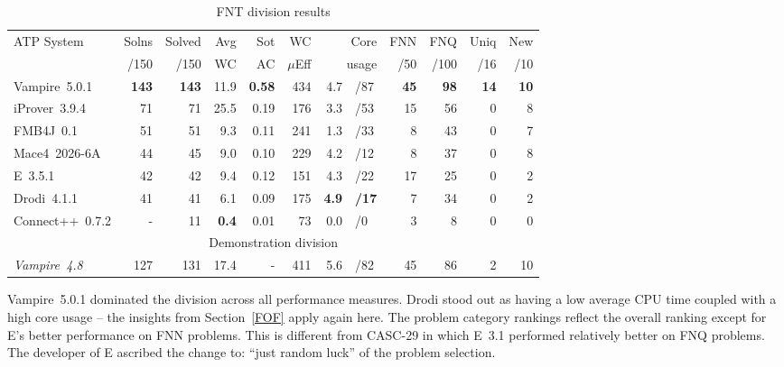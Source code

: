 \documentclass[aic]{iosart2x}
\newcommand{\bb}[1]{\bf {#1}}
\begin{document}
\begin{table}[tbh]
\caption{FNT division results}
\label{FNTSummary}
\begin{tabular}{lrrrrrr@{}l@{}rrrr}
\hline
ATP System             & Solns & Solved & Avg  &  Sot & WC       & \multicolumn{2}{r}{Core} & FNN & FNQ &Uniq & New  \\
                       & /150  & /150   & WC   &  AC  & $\mu$Eff & \multicolumn{2}{r}{usage}& /50 &/100 & /16 & /10  \\
\hline
Vampire~5.0.1          &  \bb{143}  &  \bb{143}   & 11.9 & \bb{0.58} & 434      & 4.7       & {\tiny /87 } &  \bb{45} &  \bb{98} &  \bb{14} &  \bb{10}  \\
iProver~3.9.4          &   71  &   71   & 25.5 & 0.19 & 176      & 3.3       & {\tiny /53 } &  15 &  56 &   0 &   8  \\
FMB4J~0.1              &   51  &   51   &  9.3 & 0.11 & 241      & 1.3       & {\tiny /33 } &   8 &  43 &   0 &   7  \\
Mace4~2026-6A          &   44  &   45   &  9.0 & 0.10 & 229      & 4.2       & {\tiny /12 } &   8 &  37 &   0 &   8  \\
E~3.5.1                &   42  &   42   &  9.4 & 0.12 & 151      & 4.3       & {\tiny /22 } &  17 &  25 &   0 &   2  \\
Drodi~4.1.1            &   41  &   41   &  6.1 & 0.09 & 175      & \bb{4.9}       & {\tiny \bb{/17} } &   7 &  34 &   0 &   2  \\
Connect++~0.7.2        &    -  &   11   &  \bb{0.4} & 0.01 &  73      & 0.0       & {\tiny /0  } &   3 &   8 &   0 &   0  \\
\hline
\multicolumn{12}{c}{Demonstration division} \\
\hline
\textit{Vampire~4.8}   &  127  &  131   & 17.4 &    - & 411      & 5.6       & {\tiny /82 } &  45 &  86 &  2  &  10  \\
\hline
\end{tabular}
\end{table}

Vampire~5.0.1 dominated the division across all performance measures.
Drodi stood out as having a low average CPU time coupled with a high core usage -- the insights
from Section~\ref{FOF} apply again here.
The problem category rankings reflect the overall ranking except for E's better performance
on FNN problems.
This is different from CASC-29 in which E~3.1 performed relatively better on FNQ problems.
The developer of E ascribed the change to: ``just random luck'' of the problem selection.
\end{document}
